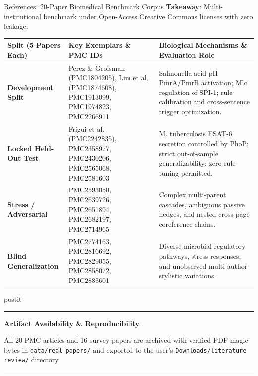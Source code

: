 \documentclass[aspectratio=43,10pt]{beamer}
\newcommand{\card}[4][\linewidth]{%
  \begin{beamercolorbox}[wd=#1,sep=0pt,rounded=false,shadow=false]{postit}%
    {\color{#3}\rule{\linewidth}{1.5pt}}\par
    \colorbox{slatebg}{%
      \begin{minipage}{\dimexpr#1-8pt\relax}%
        \vspace{1.5pt}%
        {\footnotesize\bfseries\color{#3}#2}\vspace{1.5pt}\par%
        {\scriptsize\color{darktext}#4}%
        \vspace{1.5pt}%
      \end{minipage}%
    }%
    \par{\color{bordergray}\rule{\linewidth}{0.6pt}}%
  \end{beamercolorbox}%
}
\begin{document}
\begin{frame}{References: 20-Paper Biomedical Benchmark Corpus}
  \vspace{-0.08cm}
  \textbf{Takeaway}: Multi-institutional benchmark under Open-Access Creative Commons licenses with zero leakage.
  \vspace{0.05cm}
  \begin{center}
    \fontsize{4.9pt}{6.1pt}\selectfont
    \begin{tabularx}{\linewidth}{p{2.0cm}p{3.0cm}>{\raggedright\arraybackslash}X}
      \toprule
      \textbf{\color{navy}Split (5 Papers Each)} & \textbf{\color{navy}Key Exemplars \& PMC IDs} & \textbf{\color{navy}Biological Mechanisms \& Evaluation Role} \\
      \midrule
      \textbf{Development Split} & Perez \& Groisman (PMC1804205), Lim et al. (PMC1874608), PMC1913099, PMC1974823, PMC2266911 & Salmonella acid pH PmrA/PmrB activation; Mlc regulation of SPI-1; rule calibration and cross-sentence trigger optimization. \\
      \addlinespace[1.5pt]
      \textbf{Locked Held-Out Test} & Frigui et al. (PMC2242835), PMC2358977, PMC2430206, PMC2565068, PMC2581603 & M. tuberculosis ESAT-6 secretion controlled by PhoP; strict out-of-sample generalizability; zero rule tuning permitted. \\
      \addlinespace[1.5pt]
      \textbf{Stress / Adversarial} & PMC2593050, PMC2639726, PMC2651894, PMC2682197, PMC2714965 & Complex multi-parent cascades, ambiguous passive hedges, and nested cross-page coreference chains. \\
      \addlinespace[1.5pt]
      \textbf{Blind Generalization} & PMC2774163, PMC2816692, PMC2829055, PMC2858072, PMC2885601 & Diverse microbial regulatory pathways, stress responses, and unobserved multi-author stylistic variations. \\
      \bottomrule
    \end{tabularx}
  \end{center}
  \vspace{0.04cm}
  \card{Artifact Availability \& Reproducibility}{navy}{
    \fontsize{5.2pt}{6.4pt}\selectfont All 20 PMC articles and 16 survey papers are archived with verified PDF magic bytes in \texttt{data/real\_papers/} and exported to the user's \texttt{Downloads/literature review/} directory.
  }
\end{frame}
\end{document}
